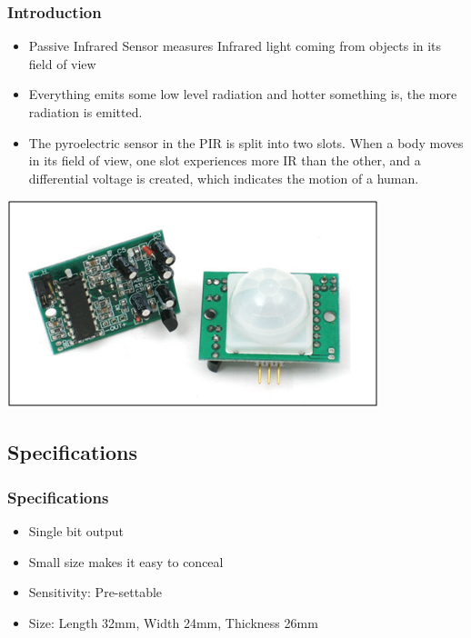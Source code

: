 \documentclass[table,10pt,red]{beamer}	%
\begin{document}
\begin{frame}
	\frametitle{Introduction}
\pause
 		
 		\color{black} 


\begin{minipage}[c]{0.6\textwidth}
			\begin{itemize}
\justifying
\item <+-|alert@+>    Passive Infrared Sensor measures Infrared light coming from objects in its field of view
\item <+-|alert@+> Everything emits some low level radiation and hotter something is, the more radiation is emitted.	
\item <+-|alert@+> The pyroelectric sensor in the PIR is split into two slots. When a body moves in its field of view, one slot experiences more IR than the other, and a differential voltage is created, which indicates the motion of a human.


\end{itemize}
		\end{minipage}
\begin{minipage}[c]{0.37\textwidth}
\hspace*{5mm}\includegraphics[width=\linewidth]{PIR_Sensor.png}
		\end{minipage}
\end{frame}

\subsection{Specifications}
\begin{frame}
	\frametitle{Specifications}
\pause 		
 		\color{black} 


			\begin{itemize}
\item <+-|alert@+>   Single bit output
\item <+-|alert@+> Small size makes it easy to conceal
\item <+-|alert@+> Sensitivity: Pre-settable
\item <+-|alert@+> Size: Length 32mm, Width 24mm, Thickness 26mm
\end{itemize}
		
\end{frame}
\end{document}
